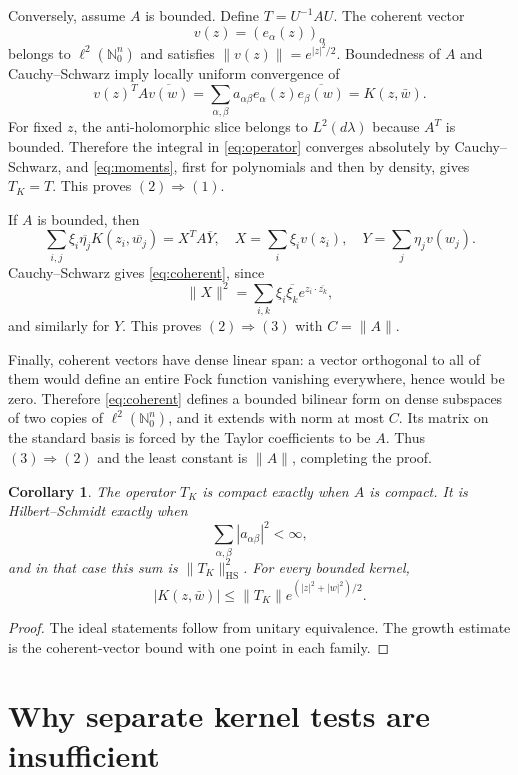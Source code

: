 \documentclass[11pt]{article}
\newtheorem{corollary}[theorem]{Corollary}
\theoremstyle{remark}
\newcommand{\ellTwo}{\ell^2(\mathbb{N}_0^n)}
\begin{document}
Conversely, assume $A$ is bounded.  Define $T=U^{-1}AU$.  The coherent
vector
\[
 v(z)=(e_\alpha(z))_\alpha
\]
belongs to $\ellTwo$ and satisfies $\|v(z)\|=e^{|z|^2/2}$.  Boundedness of
$A$ and Cauchy--Schwarz imply locally uniform convergence of
\[
 v(z)^T A\overline{v(w)}
 =\sum_{\alpha,\beta}a_{\alpha\beta}
 e_\alpha(z)\overline{e_\beta(w)}
 =K(z,\bar w).
\]
For fixed $z$, the anti-holomorphic slice belongs to $L^2(d\lambda)$ because
$A^T$ is bounded.  Therefore the integral in \eqref{eq:operator} converges
absolutely by Cauchy--Schwarz, and \eqref{eq:moments}, first for polynomials
and then by density, gives $T_K=T$.  This proves $(2)\Rightarrow(1)$.

If $A$ is bounded, then
\[
 \sum_{i,j}\xi_i\overline{\eta_j}K(z_i,\overline{w_j})
 =X^T A\overline{Y},
 \quad
 X=\sum_i\xi_i v(z_i),\quad Y=\sum_j\eta_jv(w_j).
\]
Cauchy--Schwarz gives \eqref{eq:coherent}, since
\[
 \|X\|^2=\sum_{i,k}\xi_i\overline{\xi_k}
 e^{z_i\cdot\overline{z_k}},
\]
and similarly for $Y$.  This proves $(2)\Rightarrow(3)$ with $C=\|A\|$.

Finally, coherent vectors have dense linear span: a vector orthogonal to all
of them would define an entire Fock function vanishing everywhere, hence
would be zero.  Therefore \eqref{eq:coherent} defines a bounded bilinear form
on dense subspaces of two copies of $\ellTwo$, and it extends with norm at
most $C$.  Its matrix on the standard basis is forced by the Taylor
coefficients to be $A$.  Thus $(3)\Rightarrow(2)$ and the least constant is
$\|A\|$, completing the proof.

\begin{corollary}\label{cor:ideals}
The operator $T_K$ is compact exactly when $A$ is compact.  It is
Hilbert--Schmidt exactly when
\[
 \sum_{\alpha,\beta}|a_{\alpha\beta}|^2<\infty,
\]
and in that case this sum is $\|T_K\|_{\mathrm{HS}}^2$.
For every bounded kernel,
\begin{equation}\label{eq:growth}
 |K(z,\bar w)|\leq\|T_K\|
 e^{(|z|^2+|w|^2)/2}.
\end{equation}
\end{corollary}

\begin{proof}
The ideal statements follow from unitary equivalence.  The growth estimate is
the coherent-vector bound with one point in each family.
\end{proof}

\section{Why separate kernel tests are insufficient}
\end{document}
